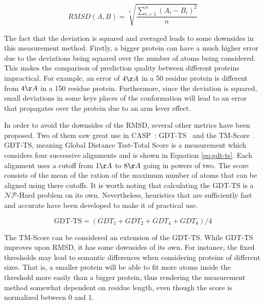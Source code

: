 
\begin{equation}
	RMSD (A, B) = \sqrt[2]{\frac{\sum^{n}_{i = 1}{(A_i - B_i)^2}}{n}}
    \label{eq:rmsd}
\end{equation}

The fact that the deviation is squared and averaged leads to some downsides in this measurement method. Firstly, a bigger protein can have a much higher error due to the deviations being squared over the number of atoms being considered. This makes the comparison of prediction quality between different proteins impractical. For example, an error of $4{\AA}$ in a 50 residue protein is different from $4{\AA}$ in a 150 residue protein. Furthermore, since the deviation is squared, small deviations in some keys places of the conformation will lead to an error that propagates over the protein due to an arm lever effect.

In order to avoid the downsides of the \ac{RMSD}, several other metrics have been proposed. Two of them saw great use in \ac{CASP}~\cite{moult2018critical}: \ac{GDT-TS}~\cite{zemla2003lga} and the \ac{TM-Score}~\cite{zhang2004scoring}. \ac{GDT-TS}, meaning Global Distance Test-Total Score is a measurement which considers four successive alignments and is shown in Equation \ref{eq:gdt-ts}. Each alignment uses a cutoff from $1{\AA}$ to $8{\AA}$ going in powers of two. The score consists of the mean of the ration of the maximum number of atoms that can be aligned using there cutoffs. It is worth noting that calculating the \ac{GDT-TS} is a $\mathcal{NP}$-Hard problem on its own. Nevertheless, heuristics that are sufficiently fast and accurate have been developed to make it of practical use.

\begin{equation}
    \text{GDT-TS} = ( GDT_1 + GDT_2 + GDT_4 + GDT_8 ) / 4
    \label{eq:gdt-ts}
\end{equation}

The \ac{TM-Score} can be considered an extension of the \ac{GDT-TS}. While \ac{GDT-TS} improves upon \ac{RMSD}, it has some downsides of its own. For instance, the fixed thresholds may lead to semantic differences when considering proteins of different sizes. That is, a smaller protein will be able to fit more atoms inside the threshold more easily than a bigger protein, thus rendering the measurement method somewhat dependent on residue length, even though the score is normalized between 0 and 1.

